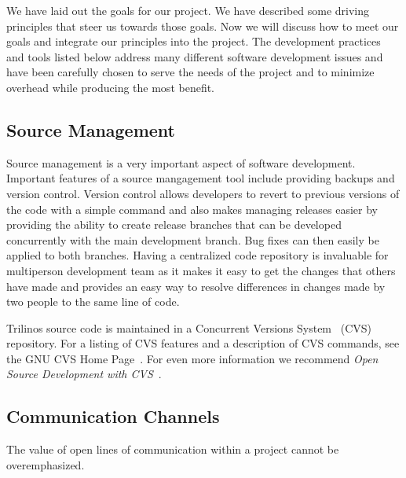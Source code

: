\documentclass[12pt,relax]{article}
\begin{document}
We have laid out the goals for our project.  We have described some driving
principles that steer us towards those goals.  Now we will discuss how to meet 
our goals and integrate our principles into the project.  
The development practices and
tools listed below address many different software development issues and 
have been carefully chosen to serve the
needs of the project and to minimize overhead while producing the most benefit.

\subsection{Source Management}


Source management is a very important aspect of software development. 
Important features of a source mangagement tool include providing backups and
version control.  Version control allows developers
to revert to previous versions of the code with a simple command and also
makes managing releases easier by providing the ability to create release 
branches that can be developed concurrently with the main development branch.
Bug fixes can then easily be applied to both branches.  Having a centralized 
code repository is invaluable for multiperson development team as it makes it
easy to get the changes that others have made and provides an easy way to 
resolve differences in changes made by two people to the same line of code.

Trilinos source code is maintained in a
Concurrent Versions System~\cite{CVS}
(CVS) repository.  For a listing of CVS features and a description of 
CVS commands,
see the GNU CVS Home Page~\cite{CVS}.  For even more information we recommend
{\it Open Source Development with CVS}~\cite{FogelBarCVS}.

\subsection{Communication Channels}

The value of open lines of communication within a project cannot be 
overemphasized.   
\end{document}
